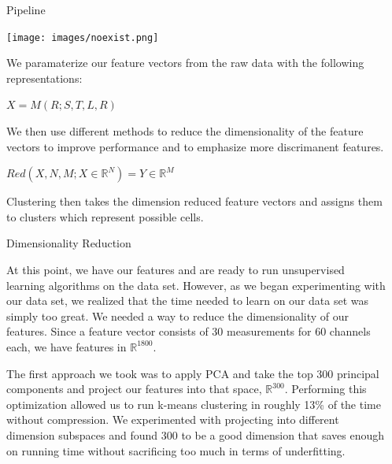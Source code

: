 \documentclass[final,t]{beamer}
\begin{document}
\begin{frame}{}
\begin{columns}[t]
\begin{column}{.3\linewidth}
    \end{column}
    \begin{column}{.3\linewidth}
      



      \begin{block}{Pipeline}
        \begin{center}
          \texttt{[image: images/noexist.png]}
        \end{center}
        
        We paramaterize our feature vectors from the raw data with the following representations:
        \begin{center}
          $X = M(R; S,T,L,R)$ 
        \end{center}
        \break
        We then use different methods to reduce the dimensionality of
        the feature vectors to improve performance and to emphasize
        more discrimanent features.
        \break
        \begin{center}
        $Red(X,N,M; X \in \mathbb{R}^N) = Y \in \mathbb{R}^M$ 
        \break
        \end{center}
        Clustering then takes the dimension reduced feature vectors
        and assigns them to clusters which represent possible cells.
        
     \end{block}
     
     \begin{block}{Dimensionality Reduction}
       \par
       
At this point, we have our features and are ready to run unsupervised
learning algorithms on the data set. However, as we began experimenting
with our data set, we realized that the time needed to learn on our data
set was simply too great. We needed a way to reduce the dimensionality of
our features. Since a feature vector consists of 30 measurements for 60
channels each, we have features in $\mathbb{R}^{1800}$.

The first approach we took was to apply PCA and take the top 300 principal
components and project our features into that space, $\mathbb{R}^{300}$.
Performing this optimization allowed us to run k-means clustering in
roughly 13\% of the time without compression. We experimented with
projecting into different dimension subspaces and found 300 to be a good
dimension that saves enough on running time without sacrificing too much
in terms of underfitting.


\end{block}
\end{column}
\end{columns}
\end{frame}
\end{document}
